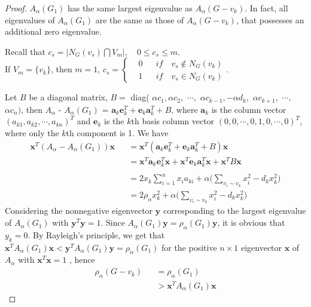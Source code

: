 \documentclass[amsthm]{elsart}
\begin{document}
\begin{proof}
$A_\alpha(G_1)$ has the same largest eigenvalue as $A_\alpha(G - v_k)$. In fact, all eigenvalues of $A_\alpha(G_1)$ are the same as those of
$A_\alpha(G - v_k)$, that possesses an additional zero eigenvalue.

Recall that $ c_s = |N_G(v_s) \bigcap V_m|, \quad 0\leqslant c_s \leqslant m$.
\\ If $V_m = \{v_k\}$, then $m = 1$,
$
c_s =
\left\{
\begin{aligned}
&0    && if \quad v_s \notin N_G(v_k) \\
&1    && if \quad v_s \in N_G(v_k)
\end{aligned}
\right.
$.

Let $B$ be a diagonal matrix, $B =$ diag(
$\alpha c_1, \alpha c_2, $ $ \cdots,$ $ \alpha c_{k-1}, - \alpha d_{k}, $ $ \alpha c_{k+1},$ $  \cdots, $ $\alpha c_n )$,
 then $A_\alpha$ - $A_\alpha(G_1)$ = $\textbf{a}_k\textbf{e}_k^T + \textbf{e}_k\textbf{a}_k^T + B$, where $\textbf{a}_k$ is the column vector $(a_{k1}, a_{k2}, \cdots , a_{kn})^T$ and $\textbf{e}_k$ is the $k$th basis column vector $(0, 0, \cdots , 0, 1, 0, \cdots , 0)^T$,
 where only the $k$th component is 1. We have
\begin{eqnarray*}
\textbf{x}^T(A_\alpha - A_\alpha(G_1))\textbf{x}
&&= \textbf{x}^T (\textbf{a}_k \textbf{e}_k^T + \textbf{e}_k \textbf{a}_k^T + B) \textbf{x}
\\ &&= \textbf{x}^T \textbf{a}_k \textbf{e}_k^T \textbf{x} + \textbf{x}^T \textbf{e}_k \textbf{a}_k^T \textbf{x} + \textbf{x}^T B \textbf{x} \\
\\ &&= 2x_k \sum \limits_{i=1}^{n}x_ia_{ki} + \alpha \big(\sum \limits_{v_i \sim v_k}^{} x_i^2 - d_k x_k^2 \big)
\\ &&= 2 \rho_\alpha x_k^2 + \alpha \big(\sum \limits_{v_i \sim v_k}^{} x_i^2 - d_k x_k^2 \big)
\end{eqnarray*}
\qquad Considering the nonnegative eigenvector $\textbf{y}$ corresponding to the largest eigenvalue of $A_\alpha(G_1)$ with $\textbf{y}^T\textbf{y} = 1$. Since $A_\alpha(G_1) \textbf{y} = \rho_\alpha(G_1) \textbf{y}$, it is obvious that $y_k = 0$. By Rayleigh's principle, we get that  $\textbf{x}^{T}A_\alpha(G_1)\textbf{x}  < \textbf{y}^{T}A_\alpha(G_1)\textbf{y} = \rho_\alpha(G_1)$ for the positive $n \times 1$ eigenvector $\textbf{x}$ of $A_\alpha$ with $\textbf{x}^{T} \textbf{x} = 1$
, hence
\begin{eqnarray}
\nonumber \rho_\alpha(G - v_k)
&&= \rho_\alpha(G_1)
\\ \nonumber &&> \textbf{x}^T A_\alpha(G_1) \textbf{x}

\end{eqnarray}
\end{proof}
\end{document}
